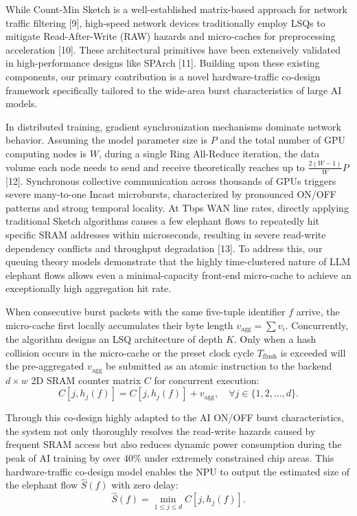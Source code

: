 \documentclass[a4paper]{jpconf}
\begin{document}
While Count-Min Sketch is a well-established matrix-based approach for network traffic filtering [9], high-speed network devices traditionally employ LSQs to mitigate Read-After-Write (RAW) hazards and micro-caches for preprocessing acceleration [10]. These architectural primitives have been extensively validated in high-performance designs like SPArch [11]. Building upon these existing components, our primary contribution is a novel hardware-traffic co-design framework specifically tailored to the wide-area burst characteristics of large AI models.


In distributed training, gradient synchronization mechanisms dominate network behavior. Assuming the model parameter size is $P$ and the total number of GPU computing nodes is $W$, during a single Ring All-Reduce iteration, the data volume each node needs to send and receive theoretically reaches up to $\frac{2(W-1)}{W}P$ [12]. Synchronous collective communication across thousands of GPUs triggers severe many-to-one Incast microbursts, characterized by pronounced ON/OFF patterns and strong temporal locality. At Tbps WAN line rates, directly applying traditional Sketch algorithms causes a few elephant flows to repeatedly hit specific SRAM addresses within microseconds, resulting in severe read-write dependency conflicts and throughput degradation [13]. To address this, our queuing theory models demonstrate that the highly time-clustered nature of LLM elephant flows allows even a minimal-capacity front-end micro-cache to achieve an exceptionally high aggregation hit rate.


When consecutive burst packets with the same five-tuple identifier $f$ arrive, the micro-cache first locally accumulates their byte length $v_{\text{agg}} = \sum v_i$. Concurrently, the algorithm designs an LSQ architecture of depth $K$. Only when a hash collision occurs in the micro-cache or the preset clock cycle $T_{\text{flush}}$ is exceeded will the pre-aggregated $v_{\text{agg}}$ be submitted as an atomic instruction to the backend $d \times w$ 2D SRAM counter matrix $C$ for concurrent execution:
\begin{equation}
C[j, h_j(f)] = C[j, h_j(f)] + v_{\mathrm{agg}}, \quad \forall j \in \{1, 2, \dots, d\}.
\end{equation}

Through this co-design highly adapted to the AI ON/OFF burst characteristics, the system not only thoroughly resolves the read-write hazards caused by frequent SRAM access but also reduces dynamic power consumption during the peak of AI training by over 40\% under extremely constrained chip areas. This hardware-traffic co-design model enables the NPU to output the estimated size of the elephant flow $\hat{S}(f)$ with zero delay:
\begin{equation}
\hat{S}(f) = \min_{1 \le j \le d} C[j, h_j(f)].
\end{equation}
\end{document}
